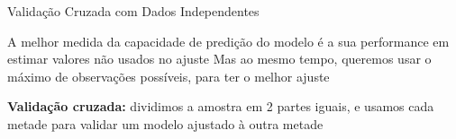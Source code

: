 \documentclass{beamer}\usepackage[]{graphicx}\usepackage[]{color}
\begin{document}

\begin{frame}{Validação Cruzada com Dados Independentes}

A melhor medida da capacidade de predição do modelo é a sua performance em estimar valores não usados no ajuste \pause
\vfill
Mas ao mesmo tempo, queremos usar o máximo de observações possíveis, para ter o melhor ajuste \pause

\vfill
\textbf{Validação cruzada:} dividimos a amostra em 2 partes iguais, e usamos cada metade para validar um modelo ajustado à outra metade

\end{frame}
\end{document}
